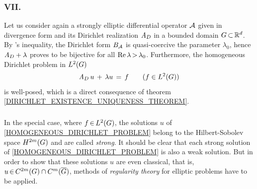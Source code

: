 \documentclass[11pt,twoside]{article}
\begin{document}

\subsubsection{VII. \TITLEG}
Let us consider again a strongly elliptic differential operator ${\mathcal{A}}$
given in divergence form and its Dirichlet realization $\mathit{A}_D$
in a bounded domain $G {\,\subset\,} {\mathbb{R}}^d$.
By {\GARDING}'s inequality,
the Dirichlet form $B_{{\mathcal{A}}}$ is quasi-coercive
{\wrt} the parameter $\lambda_0$,
hence $\mathit{A}_D + \lambda$ proves to be bijective
for all $\operatorname{Re} \lambda {\,>\,} \lambda_0$.
Furthermore,
the homogeneous Dirichlet problem in $L^2(G)$
\begin{equation}\label{HOMOGENEOUS_DIRICHLET_PROBLEM}
\mathit{A}_D \, u  \,+\, \lambda u \,=\, f \quad \quad (f \in L^2(G))
\end{equation}
is well-posed,
which is a direct consequence of
theorem \ref{DIRICHLET_EXISTENCE_UNIQUENESS_THEOREM}.

\subparagraph{}
In the special case,
where $f {\,\in\,} L^2(G)$,
the solutions $u$ of \eqref{HOMOGENEOUS_DIRICHLET_PROBLEM}
belong to the Hilbert-Sobolev space $H^{2m}(G)$ and are called \textit{strong}.
It should be clear that 
each strong solution of \eqref{HOMOGENEOUS_DIRICHLET_PROBLEM}
is also a weak solution.
But in order to show that these solutions $u$ are even classical,
that is,
$u {\,\in\,} C^{2m}(G) \cap C^m(\overline{G})$,
methods of \textit{regularity theory} for elliptic problems have to be applied.
\end{document}
